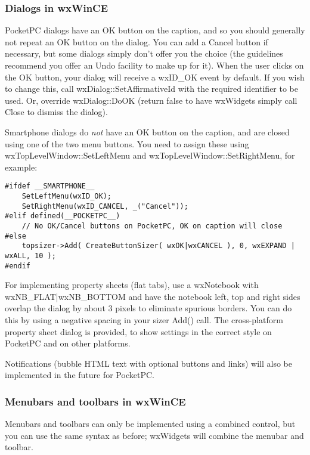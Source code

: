 \subsubsection{Dialogs in wxWinCE}

PocketPC dialogs have an OK button on the caption, and so you should generally
not repeat an OK button on the dialog. You can add a Cancel button if necessary, but some dialogs
simply don't offer you the choice (the guidelines recommend you offer an Undo facility
to make up for it). When the user clicks on the OK button, your dialog will receive
a wxID\_OK event by default. If you wish to change this, call wxDialog::SetAffirmativeId
with the required identifier to be used. Or, override wxDialog::DoOK (return false to
have wxWidgets simply call Close to dismiss the dialog).

Smartphone dialogs do {\it not} have an OK button on the caption, and are closed
using one of the two menu buttons. You need to assign these using wxTopLevelWindow::SetLeftMenu
and wxTopLevelWindow::SetRightMenu, for example:

\begin{verbatim}
#ifdef __SMARTPHONE__
    SetLeftMenu(wxID_OK);
    SetRightMenu(wxID_CANCEL, _("Cancel"));
#elif defined(__POCKETPC__)
    // No OK/Cancel buttons on PocketPC, OK on caption will close
#else
    topsizer->Add( CreateButtonSizer( wxOK|wxCANCEL ), 0, wxEXPAND | wxALL, 10 );
#endif
\end{verbatim}

For implementing property sheets (flat tabs), use a wxNotebook with wxNB_FLAT|wxNB_BOTTOM
and have the notebook left, top and right sides overlap the dialog by about 3 pixels
to eliminate spurious borders. You can do this by using a negative spacing in your
sizer Add() call. The cross-platform property sheet dialog  is
provided, to show settings in the correct style on PocketPC and on other platforms.

Notifications (bubble HTML text with optional buttons and links) will also be
implemented in the future for PocketPC.

\subsubsection{Menubars and toolbars in wxWinCE}

Menubars and toolbars can only be implemented using a combined control,
but you can use the same syntax as before; wxWidgets will combine the menubar
and toolbar.

